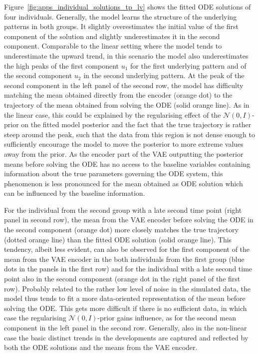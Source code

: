 Figure~\ref{fig:apps_individual_solutions_tp_lv} shows the fitted ODE solutions of four individuals.
Generally, the model learns the structure of the underlying patterns in both groups. 
It slightly overestimates the initial value of the first component of the solution and slightly underestimates it in the second component. 
Comparable to the linear setting where the model tends to underestimate the upward trend, in this scenario the model also underestimates the high peaks of the first component $u_1$ for the first underlying pattern and of the second component $u_2$ in the second underlying pattern. 
At the peak of the second component in the left panel of the second row, the model has difficulty matching the mean obtained directly from the encoder (orange dot) to the trajectory of the mean obtained from solving the ODE (solid orange line). As in the linear case, this could be explained by the regularising effect of the $\mathcal{N}(0,I)$-prior on the fitted model posterior and the fact that the true trajectory is rather steep around the peak, such that the data from this region is not dense enough to sufficiently encourage the model to move the posterior to more extreme values away from the prior. 
As the encoder part of the VAE outputting the posterior means before solving the ODE has no access to the baseline variables containing information about the true parameters governing the ODE system, this phenomenon is less pronounced for the mean obtained as ODE solution which can be influenced by the baseline information. 

For the individual from the second group with a late second time point (right panel in second row), the mean from the VAE encoder before solving the ODE in the second component (orange dot) more closely matches the true trajectory (dotted orange line) than the fitted ODE solution (solid orange line). This tendency, albeit less evident, can also be observed for the first component of the mean from the VAE encoder in the both individuals from the first group (blue dots in the panels in the first row) and for the individual with a late second time point also in the second component (orange dot in the right panel of the first row). 
Probably related to the rather low level of noise in the simulated data, the model thus tends to fit a more data-oriented representation of the mean before solving the ODE. This gets more difficult if there is no sufficient data, in which case the regularising $\mathcal{N}(0,I)$-prior gains influence, as for the second mean component in the left panel in the second row.  
Generally, also in the non-linear case the basic distinct trends in the developments are captured and reflected by both the ODE solutions and the means from the VAE encoder. 

